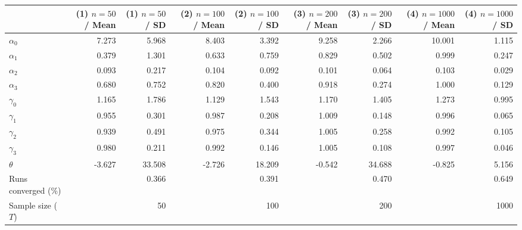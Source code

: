
\begin{tabular}[t]{lrrrrrrrr}
\toprule
  & (1) $n=50$ / Mean & (1) $n=50$ / SD & (2) $n=100$ / Mean & (2) $n=100$ / SD & (3) $n=200$ / Mean & (3) $n=200$ / SD & (4) $n=1000$ / Mean & (4) $n=1000$ / SD\\
\midrule
$\alpha_{0}$ & 7.273 & 5.968 & 8.403 & 3.392 & 9.258 & 2.266 & 10.001 & 1.115\\
$\alpha_{1}$ & 0.379 & 1.301 & 0.633 & 0.759 & 0.829 & 0.502 & 0.999 & 0.247\\
$\alpha_{2}$ & 0.093 & 0.217 & 0.104 & 0.092 & 0.101 & 0.064 & 0.103 & 0.029\\
$\alpha_{3}$ & 0.680 & 0.752 & 0.820 & 0.400 & 0.918 & 0.274 & 1.000 & 0.129\\
$\gamma_{0}$ & 1.165 & 1.786 & 1.129 & 1.543 & 1.170 & 1.405 & 1.273 & 0.995\\
$\gamma_{1}$ & 0.955 & 0.301 & 0.987 & 0.208 & 1.009 & 0.148 & 0.996 & 0.065\\
$\gamma_{2}$ & 0.939 & 0.491 & 0.975 & 0.344 & 1.005 & 0.258 & 0.992 & 0.105\\
$\gamma_{3}$ & 0.980 & 0.211 & 0.992 & 0.146 & 1.005 & 0.108 & 0.997 & 0.046\\
$\theta$ & -3.627 & 33.508 & -2.726 & 18.209 & -0.542 & 34.688 & -0.825 & 5.156\\
Runs converged (\%) &  & 0.366 &  & 0.391 &  & 0.470 &  & 0.649\\
Sample size ($T$) &  & 50 &  & 100 &  & 200 &  & 1000\\
\bottomrule
\end{tabular}
